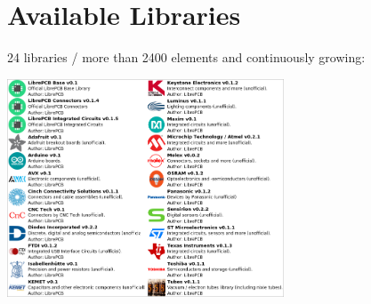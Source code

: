 \section{Available Libraries}

\begin{frame}{\secname}

  24 libraries / more than 2400 elements and continuously growing:

  \begin{center}
    \includegraphics[height=6.5cm]{images/available_libraries.png}
  \end{center}

\end{frame}
